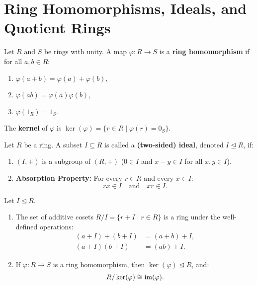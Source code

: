 \section{Ring Homomorphisms, Ideals, and Quotient Rings}
\label{sec:ideals_quotients}

\begin{definition}
Let $R$ and $S$ be rings with unity. A map $\varphi: R \to S$ is a \textbf{ring homomorphism} if for all $a, b \in R$:
\begin{enumerate}[label=\textbf{(\roman*)}, leftmargin=*, itemsep=4pt]
    \item $\varphi(a + b) = \varphi(a) + \varphi(b)$,
    \item $\varphi(ab) = \varphi(a)\varphi(b)$,
    \item $\varphi(1_R) = 1_S$.
\end{enumerate}
The \textbf{kernel} of $\varphi$ is $\ker(\varphi) = \{ r \in R \mid \varphi(r) = 0_S \}$.
\end{definition}

\begin{definition}[Ideal]
Let $R$ be a ring. A subset $I \subseteq R$ is called a \textbf{(two-sided) ideal}, denoted $I \trianglelefteq R$, if:
\begin{enumerate}[label=\textbf{(\arabic*)}, leftmargin=*, itemsep=4pt]
    \item $(I, +)$ is a subgroup of $(R, +)$ ($0 \in I$ and $x - y \in I$ for all $x, y \in I$).
    \item \textbf{Absorption Property:} For every $r \in R$ and every $x \in I$:
    \begin{equation}
    rx \in I \quad \text{and} \quad xr \in I.
    \end{equation}
\end{enumerate}
\end{definition}

\begin{theorem}
\label{thm:ring_iso1}
Let $I \trianglelefteq R$.
\begin{enumerate}[label=\textbf{(\roman*)}, leftmargin=*, itemsep=4pt]
    \item The set of additive cosets $R/I = \{ r + I \mid r \in R \}$ is a ring under the well-defined operations:
    \begin{align}
    (a + I) + (b + I) &= (a + b) + I, \\
    (a + I)(b + I) &= (ab) + I.
    \end{align}
    \item If $\varphi: R \to S$ is a ring homomorphism, then $\ker(\varphi) \trianglelefteq R$, and:
    \begin{equation}
    R/\ker(\varphi) \cong \operatorname{im}(\varphi).
    \end{equation}
\end{enumerate}
\end{theorem}

